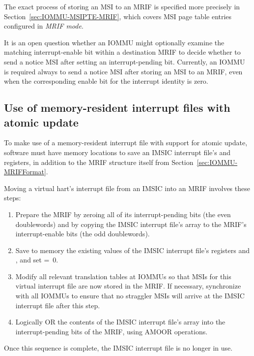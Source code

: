 The exact process of storing an MSI to an MRIF is specified more
precisely in Section~\ref{sec:IOMMU-MSIPTE-MRIF}, which covers MSI page
table entries configured in \emph{MRIF mode}.

\begin{commentary}
It is an open question whether an \mbox{IOMMU} might optionally examine
the matching interrupt-enable bit within a destination MRIF to decide
whether to send a notice MSI after setting an interrupt-pending bit.
Currently, an \mbox{IOMMU} is required always to send a notice MSI after
storing an MSI to an MRIF, even when the corresponding enable bit for
the interrupt identity is zero.
\end{commentary}

\subsection{Use of memory-resident interrupt files with atomic update}

To make use of a memory-resident interrupt file with support for atomic
update, software must have memory locations to save an IMSIC interrupt
file's  and  registers, in addition to the
MRIF structure itself from Section~\ref{sec:IOMMU-MRIFFormat}.

Moving a virtual hart's interrupt file from an IMSIC into an MRIF
involves these steps:
\begin{enumerate}

\item
Prepare the MRIF by zeroing all of its interrupt-pending bits (the even
doublewords) and by copying the IMSIC interrupt file's  array to
the MRIF's interrupt-enable bits (the odd doublewords).

\item
Save to memory the existing values of the IMSIC interrupt file's
registers  and , and set 
=~0.

\item
Modify all relevant translation tables at \mbox{IOMMU}s so that MSIs for
this virtual interrupt file are now stored in the MRIF.
If necessary, synchronize with all \mbox{IOMMU}s to ensure that no straggler
MSIs will arrive at the IMSIC interrupt file after this step.

\item
Logically OR the contents of the IMSIC interrupt file's  array
into the interrupt-pending bits of the MRIF, using AMOOR operations.

\end{enumerate}
Once this sequence is complete, the IMSIC interrupt file is no longer
in use.

